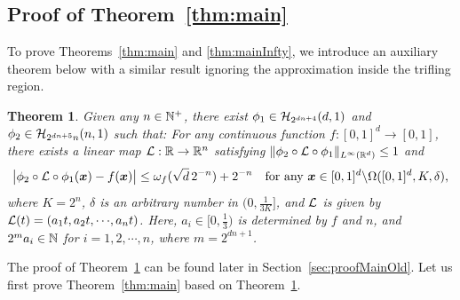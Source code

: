 \documentclass[nohyperref]{article}
\theoremstyle{plain}
\newtheorem{theorem}{Theorem}[section]
\theoremstyle{definition}
\theoremstyle{remark}
\begin{document}
\subsection{Proof of Theorem~\ref{thm:main}}
To prove  Theorems~\ref{thm:main} and \ref{thm:mainInfty}, we introduce an auxiliary theorem below with a similar result  ignoring the approximation inside the trifling region.
\begin{theorem}%
	\label{thm:mainOld}
	Given any $n\in\N^+$, there exist  $\phi_1\in {\mathcal{H}}_{ 2^{dn+4} }(d,1)$ and $\phi_2\in {\mathcal{H}}_{ 2^{dn+5}n }(n,1)$ such that: For any continuous function $f:[0,1]^d\to [0,1]$, there exists a linear map $\calL:\R\to \R^n$ satisfying $\|\phi_2\circ \calL \circ\phi_1\|_{L^\infty(\R^d)}\le 1$  and
	\begin{equation*}
		\big|\phi_2\circ {\mathcal{L}} \circ\phi_1({\bm{x}})-f({\bm{x}})\big|\le \omega_f(\sqrt{d}\, 2^{-n})+2^{-n}\quad \textnormal{for any ${\bm{x}}\in [0,1]^d\backslash \Omega([0,1]^d,K,\delta)$,}
	\end{equation*}
	where $K=2^n$, $\delta$ is an arbitrary number in $(0,\tfrac{1}{3K}]$, and ${\mathcal{L}}$ is given by $\calL(t)=(a_1t, a_2 t,\cdots,a_n t)$. Here, $a_i\in [0,\tfrac{1}{3})$ is determined by $f$ and $n$, and $2^m a_i\in\N$ for $i=1,2,\cdots,n$, where $m=2^{dn+1}$.
\end{theorem}
The proof of Theorem~\ref{thm:mainOld} can be found later in Section~\ref{sec:proofMainOld}.
Let us first prove Theorem~\ref{thm:main} based on Theorem~\ref{thm:mainOld}.
\end{document}
